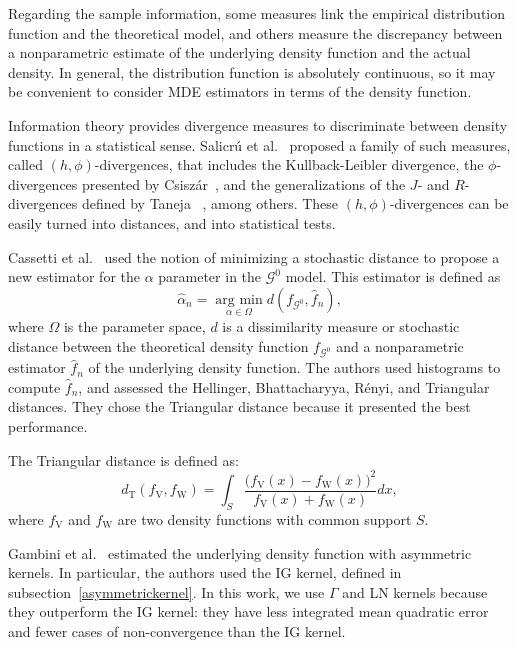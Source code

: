 \documentclass[twocolumn]{svjour3}
\newcommand{\argmin}{\operatorname*{\text{arg min }}}
\begin{document}
Regarding the sample information, some measures link the empirical distribution function and the theoretical model, and others measure the discrepancy between a nonparametric estimate of the underlying density function and the actual density. 
In general, the distribution function is absolutely continuous, so it may be convenient to consider MDE estimators in terms of the density function. 

Information theory provides divergence measures to discriminate between density functions in a statistical sense. 
Salicr\'u et al.~\cite{Salicru1994} proposed a family of such measures, called $(h,\phi)$-divergences, that includes the Kullback-Leibler divergence,  
the $\phi$-divergences presented by Csisz\'ar~\cite{Csiszar1967}, 
and the generalizations of the $J$- and $R$-divergences defined by Taneja ~\cite{Taneja1989}, among others.
These $(h,\phi)$-divergences can be easily turned into distances, and into statistical tests.

Cassetti et al.~\cite{APSAR2013ParameterEstimationStochasticDistances} used the notion of minimizing a stochastic distance to propose a new estimator for the $\alpha$ parameter in the $\mathcal{G}^0$ model. 
This estimator is defined as
\begin{equation}
	\widehat{\alpha}_n=\argmin_{\alpha\in\Omega} d(f_{\mathcal{G}^0}, \widehat{f}_n),
	\label{MDE}
\end{equation}
where $\Omega$ is the parameter space, $d$ is a dissimilarity measure or stochastic distance between the theoretical density function $f_{\mathcal{G}^0}$ and a nonparametric estimator $\widehat{f}_n$ of the underlying density function.
The authors used histograms to compute $\widehat{f}_n$, and assessed the Hellinger, Bhattacharyya, R\'enyi, and Triangular distances. 
They chose the Triangular distance because it presented the best performance.

The Triangular distance is defined as:
\begin{equation}
	d_{\text{{T}}}(f_{\text{{V}}},f_{\text{{W}}})=\int_{S}\frac{\big(f_{\text{{V}}}(x)-f_{\text{{W}}}(x)\big)^2}{f_{\text{{V}}}(x)+f_{\text{{W}}}(x)}dx,
	\label{DT}
\end{equation}
where $f_{\text{{V}}}$ and $f_{\text{{W}}}$ are two density functions with common support $S$.

Gambini et al.~\cite{gambini2015} estimated the underlying density function with asymmetric kernels.
In particular, the authors used the IG kernel, defined in subsection~\ref{asymmetrickernel}. 
In this work, we use $\Gamma$ and LN kernels because they outperform the IG kernel: they have less integrated mean quadratic error and fewer cases of non-convergence than the IG kernel.
\end{document}
